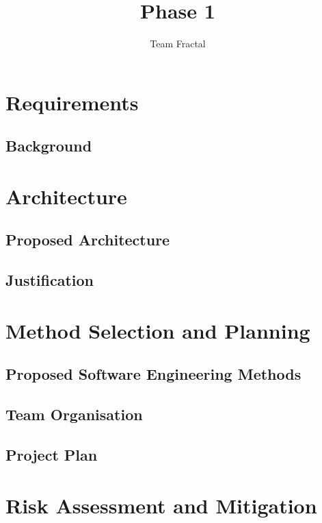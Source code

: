 \documentclass{report}   	%
\title{Phase 1}
\author{Team Fractal}
\date{}							%
\begin{document}
\maketitle

\chapter{Requirements}
\section{Background}


\restoregeometry

\chapter{Architecture}
\section{Proposed Architecture}
\section{Justification}

\chapter{Method Selection and Planning}
\section{Proposed Software Engineering Methods}
\section{Team Organisation}
\section{Project Plan}

\chapter{Risk Assessment and Mitigation}
\end{document}
